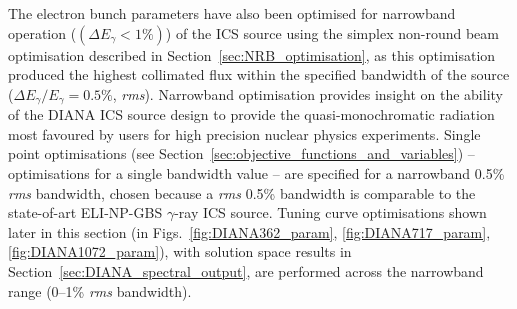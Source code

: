 \documentclass[../main.tex]{subfiles}
\begin{document}
The electron bunch parameters have also been optimised for narrowband operation ($\left(\Delta E_{\gamma}<1\%\right)$) of the ICS source using the simplex non-round beam optimisation described in Section~\ref{sec:NRB_optimisation}, as this optimisation produced the highest collimated flux within the specified bandwidth of the source ($\Delta E_{\gamma}/E_{\gamma}=0.5\%$, \textit{rms}). Narrowband optimisation provides insight on the ability of the DIANA ICS source design to provide the quasi-monochromatic radiation most favoured by users for high precision nuclear physics experiments. Single point optimisations (see Section~\ref{sec:objective_functions_and_variables}) -- optimisations for a single bandwidth value --  are specified for a narrowband 0.5\% \textit{rms} bandwidth, chosen because a \textit{rms} 0.5\% bandwidth is comparable to the state-of-art ELI-NP-GBS \cite{elinp2019vega} $\gamma$-ray ICS source. Tuning curve optimisations shown later in this section (in Figs.~\ref{fig:DIANA362_param}, \ref{fig:DIANA717_param}, \ref{fig:DIANA1072_param}), with solution space results in Section~\ref{sec:DIANA_spectral_output}, are performed across the narrowband range (0--1\% \textit{rms} bandwidth).    
\end{document}
